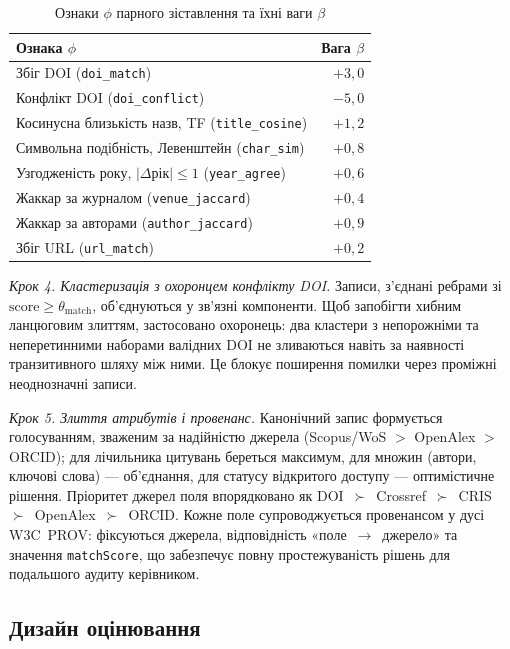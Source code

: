 \begin{table}[ht]
\centering
\caption{Ознаки $\phi$ парного зіставлення та їхні ваги $\beta$}
\label{tab:features}
\begin{tabular}{lr}
\toprule
Ознака $\phi$ & Вага $\beta$ \\
\midrule
Збіг DOI (\texttt{doi\_match}) & $+3{,}0$ \\
Конфлікт DOI (\texttt{doi\_conflict}) & $-5{,}0$ \\
Косинусна близькість назв, TF (\texttt{title\_cosine}) & $+1{,}2$ \\
Символьна подібність, Левенштейн (\texttt{char\_sim}) & $+0{,}8$ \\
Узгодженість року, $|\Delta\text{рік}|\le 1$ (\texttt{year\_agree}) & $+0{,}6$ \\
Жаккар за журналом (\texttt{venue\_jaccard}) & $+0{,}4$ \\
Жаккар за авторами (\texttt{author\_jaccard}) & $+0{,}9$ \\
Збіг URL (\texttt{url\_match}) & $+0{,}2$ \\
\bottomrule
\end{tabular}
\end{table}

\emph{Крок 4. Кластеризація з охоронцем конфлікту DOI.} Записи, з'єднані ребрами зі $\mathrm{score}\ge\theta_{\text{match}}$, об'єднуються у зв'язні компоненти. Щоб запобігти хибним ланцюговим злиттям, застосовано охоронець: два кластери з непорожніми та неперетинними наборами валідних DOI не зливаються навіть за наявності транзитивного шляху між ними. Це блокує поширення помилки через проміжні неоднозначні записи.

\emph{Крок 5. Злиття атрибутів і провенанс.} Канонічний запис формується голосуванням, зваженим за надійністю джерела (Scopus/WoS $>$ OpenAlex $>$ ORCID); для лічильника цитувань береться максимум, для множин (автори, ключові слова) — об'єднання, для статусу відкритого доступу — оптимістичне рішення. Пріоритет джерел поля впорядковано як DOI~$\succ$~Crossref~$\succ$~CRIS~$\succ$~OpenAlex~$\succ$~ORCID. Кожне поле супроводжується провенансом у дусі W3C~PROV: фіксуються джерела, відповідність «поле~$\rightarrow$~джерело» та значення \texttt{matchScore}, що забезпечує повну простежуваність рішень для подальшого аудиту керівником.

\subsection*{Дизайн оцінювання}

